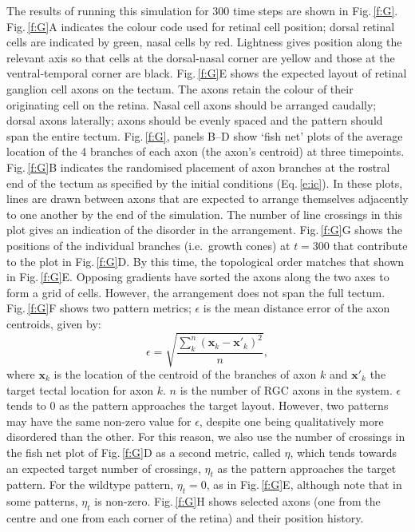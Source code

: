 \documentclass[11pt, a4paper, draft]{article}
\begin{document}
The results of running this simulation for 300 time steps are shown in
Fig.\,\ref{f:G}. Fig.\,\ref{f:G}A indicates the colour code used for retinal
cell position; dorsal retinal cells are indicated by green, nasal cells by
red. Lightness gives position along the relevant axis so that cells at the
dorsal-nasal corner are yellow and those at the ventral-temporal corner are
black. Fig.\,\ref{f:G}E shows the expected layout of retinal ganglion cell
axons on the tectum. The axons retain the colour of their originating cell on
the retina. Nasal cell axons should be arranged
caudally; dorsal axons laterally; axons should be evenly spaced and the
pattern should span the entire tectum.  Fig.\,\ref{f:G}, panels B--D show
`fish net' plots of the average location of the 4 branches of each axon (the
axon's centroid) at three timepoints. Fig.\,\ref{f:G}B indicates the
randomised placement of axon branches at the rostral end of the tectum as
specified by the initial conditions (Eq.\,\ref{e:ic}). In these plots, lines are drawn between
axons that are expected to arrange themselves adjacently to one another by the
end of the simulation. The number of line crossings in this plot gives an
indication of the disorder in the arrangement. Fig.\,\ref{f:G}G shows the positions of the individual branches
(i.e.~growth cones) at $t=300$ that contribute to the plot in
Fig.\,\ref{f:G}D. By this time, the topological order matches that shown in
Fig.\,\ref{f:G}E. Opposing gradients have sorted the axons along the two axes
to form a grid of cells. However, the arrangement does not span the full
tectum. Fig.\,\ref{f:G}F shows two pattern metrics; $\epsilon$ is the mean
distance error of the axon centroids, given by:
%
\begin{equation}\label{e:eps}
\epsilon = \sqrt{\frac{\sum_k^n (\mathbf{x}_{k} - \mathbf{x}'_{k})^2}{n}},
\end{equation}
%
where $\mathbf{x}_{k}$ is the location of the centroid of the
branches of axon $k$ and $\mathbf{x}'_{k}$ the target tectal location for axon
$k$. $n$ is the number of RGC axons in the system.
%
$\epsilon$ tends to 0 as the pattern approaches the target layout. However,
two patterns may have the same non-zero value for $\epsilon$, despite one
being qualitatively more disordered than the other. For this reason, we also
use the number of crossings in the fish net plot of Fig.\,\ref{f:G}D as a
second metric, called $\eta$, which tends towards an expected target number of
crossings, $\eta_t$ as the pattern approaches the target pattern.  For the wildtype
pattern, $\eta_t=0$, as in Fig.\,\ref{f:G}E, although note that in some patterns,
$\eta_t$ is non-zero. Fig.\,\ref{f:G}H shows selected
axons (one from the centre and one from each corner of the retina) and their
position history.
\end{document}
